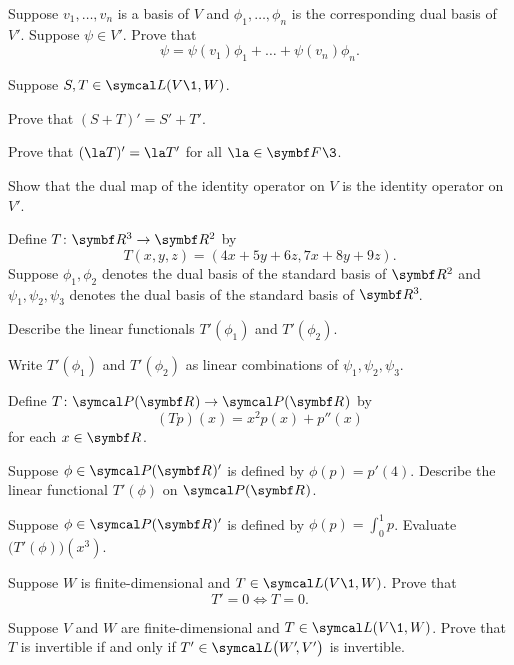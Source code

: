 \begin{exercises}
\exercise
Suppose $v_1, \dots, v_n$ is a basis of $V$ and $\phi_1, \dots, \phi_n$ is the corresponding dual basis of $V'\!$. Suppose $\psi \in V'\!$. Prove that
\[
\psi = \psi(v_1) \phi_1 + \dots + \psi(v_n) \phi_n.
\]
\exercisedisplayend


\exercise
Suppose $S, T \in \L(V\1, W)$.
\begin{subtheorem}
\item
Prove that $(S + T)' = S' + T'\!$.
\item
Prove that $(\la T)' = \la T'$ for all $\la \in \F{}\3$.
\end{subtheorem}


\exercise
Show that the dual map of the identity operator on $V$ is the identity operator on~$V'\!$.


\exercise
Define $T \colon \R{3} \to \R2$ by
\[
T(x, y, z) = (4x + 5y + 6z, 7x + 8y + 9z).
\]
Suppose $\phi_1, \phi_2$ denotes the dual basis of the standard basis of $\R2$ and $\psi_1, \psi_2, \psi_3$ denotes the dual basis of the standard basis of $\RR3$.
\begin{subtheorem}
\item
Describe the linear functionals $T' \! (\phi_1)$ and $T' \! (\phi_2)$.
\item
Write $T' \! (\phi_1)$ and $T' \! (\phi_2)$ as linear combinations of $\psi_1, \psi_2, \psi_3$.
\end{subtheorem}
\exercisesubtheoremend


\exercise
Define $T \colon \P(\R{})\to \P(\R{})$ by
\[
(Tp)(x) = x^2 p(x) + p'' \! (x)
\]
for each $x \in \R{}$.
\begin{subtheorem}
\item
Suppose $\phi \in \P(\R{})'$ is defined by \mbox{$\phi(p) = p' \! (4)$}.
Describe the linear functional $T' \! (\phi)$ on $\P(\R{})$.
\item
Suppose $\phi \in \P(\R{})'$ is defined by
$
\phi(p) = \int_0^1 p$.
Evaluate $\bigl(T' \! (\phi)\bigr)(x^3)$.
\end{subtheorem}
\exercisesubtheoremend


\exercise
Suppose $W$ is finite-dimensional and $T \in \L(V\1, W)$. Prove that \label{Tprime}
\[
T' = 0 \iff T = 0.
\]
\exercisedisplayend


\exercise
Suppose $V$ and $W$ are finite-dimensional and $T \in \L(V\1, W)$. Prove that $T$ is invertible if and only if
$T' \in \L\paren[\big]{W'\!, V'}$ is invertible.



\end{exercises}
